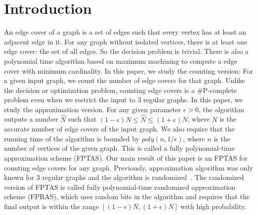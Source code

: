 \section{Introduction}
An edge cover of a graph is a set of edges such that every vertex has at least an adjacent edge in it.
 For any graph without isolated vertices, there is at least one edge cover: the set of all edges. So the decision problem is trivial. There is also a polynomial time algorithm based on maximum machining to compute a edge cover with minimum cardinality.     In this paper, we study the counting version:
 For a given input graph, we count the number of edge covers for that graph. Unlike the decision or optimization problem, counting edge covers is a \#P-complete problem even when we restrict the input to 3 regular graphs. In this paper, we study the approximation version. For any given parameter $\epsilon>0$, the algorithm outputs a number $\hat{N}$ such that $(1-\epsilon) N\leq \hat{N} \leq (1+\epsilon) N$, where $N$ is the accurate number of edge covers of the input graph. We also require that the running time of the algorithm is bounded by $poly(n,1/\epsilon)$, where $n$ is the number of vertices of the given graph. This is called a fully polynomial-time approximation scheme (FPTAS). Our main result of this paper is an FPTAS for counting edge covers for any graph. Previously, approximation algorithm was only known for 3 regular graphs and the algorithm is randomized~\cite{MFCS09}. The randomized version of FPTAS is called fully polynomial-time randomized approximation scheme (FPRAS), which uses random bits in the algorithm and requires that the final output is within the range $[(1-\epsilon) N, (1+\epsilon) N]$ with high probability.

